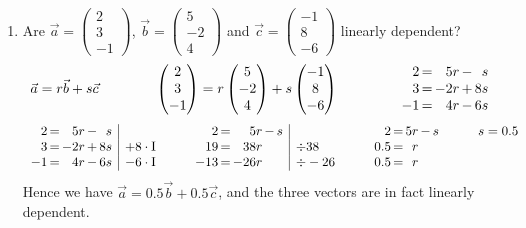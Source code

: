 \documentclass[12pt,eng]{skript_ogg}
\begin{document}
\begin{beispiel}
\begin{enumerate}
	\item Are $\vec{a}=\begin{pmatrix}2\\3\\-1
\end{pmatrix}$, $\vec{b}=\begin{pmatrix}5\\-2\\4
\end{pmatrix}$ and $\vec{c}=\begin{pmatrix}-1\\8\\-6
\end{pmatrix}$ linearly dependent?
\[\vec{a}=r\vec{b}+s\vec{c}\qquad\qquad\begin{pmatrix}2\\3\\-1
\end{pmatrix}=r\begin{pmatrix}5\\-2\\4
\end{pmatrix}+s\begin{pmatrix}-1\\8\\-6
\end{pmatrix}\qquad\qquad\begin{array}{r@{\,}c@{\,}r@{\,}c@{\,}r}
2 & = & 5r & - & s\\
3 & = & -2r & + & 8s\\
-1 & = & 4r & - & 6s\end{array}\]
\[\begin{array}{r@{\,}c@{\,}r@{\,}c@{\,}r|l}
2 & = & 5r & - & s &\\
3 & = & -2r & + & 8s & +8\cdot\mbox{I}\\
-1 & = & 4r & - & 6s &
-6\cdot\mbox{I}\end{array}\qquad\begin{array}{r@{\,}c@{\,}r@{\,}c@{\,}r|l}
2 & = & 5r & - & s &\\
19 & = & 38r & & & \div 38\\
-13 & = & -26r & & & \div
-26\end{array}\qquad\begin{array}{r@{\,}c@{\,}r@{\,}c@{\,}r}
2 & = & 5r & - & s \\
0.5 & = & r & & \\
0.5 & = & r & & \end{array}\qquad\begin{array}{l}
s=0.5\\
\text{ }\\
\text{ }
\end{array}\]
Hence we have $\vec{a}=0.5\vec{b}+0.5\vec{c}$, and the three vectors are in fact linearly dependent.


\end{enumerate}
\end{beispiel}
\end{document}
